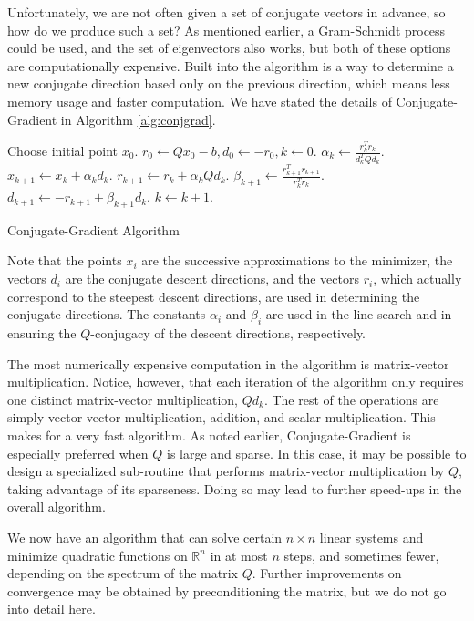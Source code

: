 Unfortunately, we are not often given a set of conjugate vectors in advance, so how do we produce such a set? As mentioned earlier, a
Gram-Schmidt process could be used, and the set of eigenvectors also works, but both of these options are computationally expensive.
Built into the algorithm is a way to determine a new conjugate direction based only on the previous direction, which means less memory usage and
faster computation. We have stated the details of Conjugate-Gradient in Algorithm \ref{alg:conjgrad}.
\begin{algorithm}
\begin{algorithmic}[1]
    \State \textrm{Choose initial point } $x_0$.
    \State $r_0 \gets Qx_0 - b, d_0 \gets -r_0, k \gets 0$.
        \State $\alpha_k \gets \frac{r_k^Tr_k}{d_k^TQd_k}$.
        \State $x_{k+1} \gets x_k + \alpha_kd_k$.
        \State $r_{k+1} \gets r_k + \alpha_kQd_k$.
        \State $\beta_{k+1} \gets \frac{r_{k+1}^Tr_{k+1}}{r_k^Tr_k}$.
        \State $d_{k+1} \gets -r_{k+1} + \beta_{k+1}d_k$.
        \State $k \gets k+1$.
    \EndWhile
\EndProcedure
\end{algorithmic}
\caption{Conjugate-Gradient Algorithm}
\label{alg:conjgrad}
\end{algorithm}

Note that the points $x_i$ are the successive approximations to the minimizer, the vectors $d_i$ are the conjugate descent
directions, and the vectors $r_i$, which actually correspond to the steepest descent directions, are used in determining the conjugate directions.
The constants $\alpha_i$ and $\beta_i$ are used in the line-search and in ensuring the $Q$-conjugacy of the descent directions, respectively.

The most numerically expensive computation in the algorithm is matrix-vector multiplication.
Notice, however, that each iteration of the algorithm only requires one distinct matrix-vector multiplication, $Qd_k$. The rest of the
operations are simply vector-vector multiplication, addition, and scalar multiplication. This makes for a very fast algorithm.
As noted earlier, Conjugate-Gradient is especially preferred when $Q$ is large and sparse. In this case, it may be possible to
design a specialized sub-routine that performs matrix-vector multiplication by $Q$, taking advantage of its sparseness. Doing so may
lead to further speed-ups in the overall algorithm.

We now have an algorithm that can solve certain $n \times n$ linear systems and minimize quadratic functions on $\mathbb{R}^n$ in at most $n$ steps,
and sometimes fewer, depending on the spectrum of the matrix $Q$. Further improvements on convergence may be obtained by preconditioning the matrix,
but we do not go into detail here.

